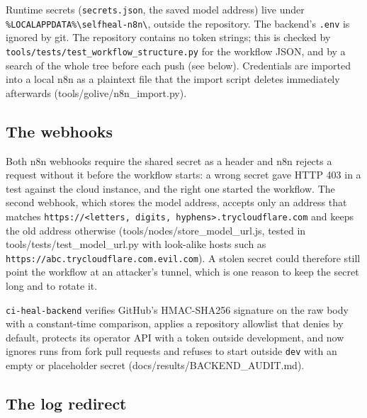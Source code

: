 Runtime secrets (\texttt{secrets.\allowbreak{}json}, the saved model address) live under \texttt{\%LOCALAPPDATA\%\textbackslash{}selfheal-\allowbreak{}n8n\textbackslash{}}, outside the repository. The backend's \texttt{.\allowbreak{}env} is ignored by git. The repository contains no token strings; this is checked by \texttt{tools/\allowbreak{}tests/\allowbreak{}test\_\allowbreak{}workflow\_\allowbreak{}structure.\allowbreak{}py} for the workflow JSON, and by a search of the whole tree before each push (see below). Credentials are imported into a local n8n as a plaintext file that the import script deletes immediately afterwards (tools/\allowbreak{}golive/\allowbreak{}n8n\_\allowbreak{}import.py).

\subsection{The webhooks}

Both n8n webhooks require the shared secret as a header and n8n rejects a request without it before the workflow starts: a wrong secret gave HTTP 403 in a test against the cloud instance, and the right one started the workflow. The second webhook, which stores the model address, accepts only an address that matches \texttt{https:\allowbreak{}/\allowbreak{}/\allowbreak{}\textless{}letters, digits, hyphens\textgreater{}.\allowbreak{}trycloudflare.\allowbreak{}com} and keeps the old address otherwise (tools/\allowbreak{}nodes/\allowbreak{}store\_\allowbreak{}model\_\allowbreak{}url.js, tested in tools/\allowbreak{}tests/\allowbreak{}test\_\allowbreak{}model\_\allowbreak{}url.py with look-alike hosts such as \texttt{https:\allowbreak{}/\allowbreak{}/\allowbreak{}abc.\allowbreak{}trycloudflare.\allowbreak{}com.\allowbreak{}evil.\allowbreak{}com}). A stolen secret could therefore still point the workflow at an attacker's tunnel, which is one reason to keep the secret long and to rotate it.

\texttt{ci-\allowbreak{}heal-\allowbreak{}backend} verifies GitHub's HMAC-SHA256 signature on the raw body with a constant-time comparison, applies a repository allowlist that denies by default, protects its operator API with a token outside development, and now ignores runs from fork pull requests and refuses to start outside \texttt{dev} with an empty or placeholder secret (docs/\allowbreak{}results/\allowbreak{}BACKEND\_\allowbreak{}AUDIT.md).

\subsection{The log redirect}

